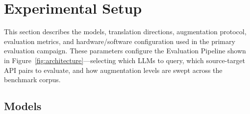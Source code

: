 \documentclass[conference]{IEEEtran}
\begin{document}



\section{Experimental Setup}
\label{sec:experimental-setup}

This section describes the models, translation directions, augmentation protocol, evaluation metrics, and hardware/software configuration used in the primary evaluation campaign. These parameters configure the Evaluation Pipeline shown in Figure~\ref{fig:architecture}---selecting which LLMs to query, which source-target API pairs to evaluate, and how augmentation levels are swept across the benchmark corpus.

\subsection{Models}
\label{sec:models}
\end{document}
